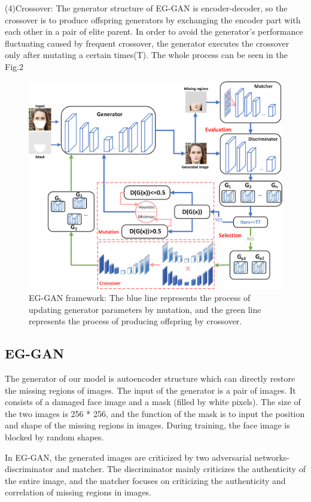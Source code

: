 \documentclass[journal]{IEEEtran}
\begin{document}
(4)Crossover: The generator structure of EG-GAN is encoder-decoder, so the crossover is to produce offspring generators by exchanging the encoder part with each other in a pair of elite parent. In order to avoid the generator's performance fluctuating caused by frequent crossover, the generator executes the crossover only after mutating a certain times(T). The whole process can be seen in the Fig.2
\begin{figure}[H]
\centering
\includegraphics[width=0.7\linewidth]{figures/Fig1.png}
\caption{EG-GAN framework: The blue line represents the process of updating generator parameters by mutation, and the green line represents the process of producing offspring by crossover.}
\label{fig:Fig1}
\end{figure}
\subsection{EG-GAN}
The generator of our model is autoencoder structure which can directly restore the missing regions of images. The input of the generator is a pair of images. It consists of a damaged face image and a mask (filled by white pixels). The size of the two images is 256 * 256, and the function of the mask is to input the position and shape of the missing regions in images. During training, the face image is blocked by random shapes.

In EG-GAN, the generated images are criticized by two adversarial networks-discriminator and matcher. The discriminator mainly criticizes the authenticity of the entire image, and the matcher focuses on criticizing the authenticity and correlation of missing regions in images.
\end{document}
